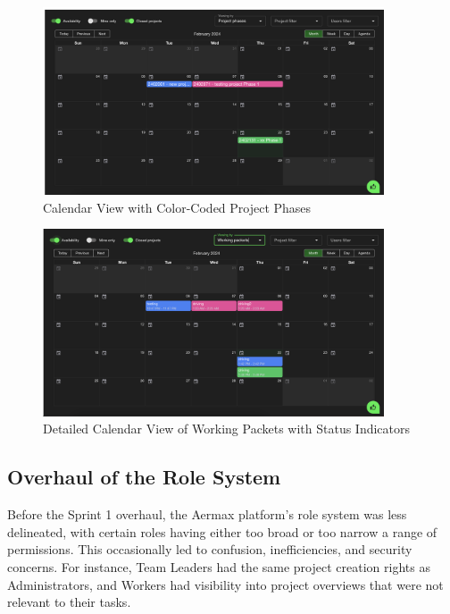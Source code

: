\begin{figure}[H]
    \centering
    \includegraphics[width=0.9\textwidth]{src/assets/chapters/calendar1.png}
    \caption{Calendar View with Color-Coded Project Phases}
    \label{fig:calendar_view_color_coded}
\end{figure}

\begin{figure}[H]
    \centering
    \includegraphics[width=0.9\textwidth]{src/assets/chapters/calendar2.png}
    \caption{Detailed Calendar View of Working Packets with Status Indicators}
    \label{fig:detailed_calendar_view}
\end{figure}



\subsection{Overhaul of the Role System}
Before the Sprint 1 overhaul, the Aermax platform's role system was less delineated, with certain roles having either too broad or too narrow a range of permissions. This occasionally led to confusion, inefficiencies, and security concerns. For instance, Team Leaders had the same project creation rights as Administrators, and Workers had visibility into project overviews that were not relevant to their tasks.

